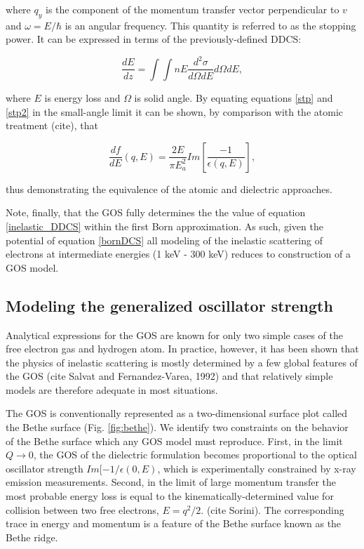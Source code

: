 \documentclass [11pt, proquest, article] {uwthesis}[2016/11/22]
\begin{document}
where $q_y$ is the component of the momentum transfer vector perpendicular to $v$ and $\omega = E/\hbar$ is an angular frequency. This quantity is referred to as the stopping power. It can be expressed in terms of the previously-defined DDCS:

\begin{equation} \label{stp2}
\frac{dE}{dz} = \int \int n E \frac{d^2\sigma}{d\Omega dE} d\Omega dE,
\end{equation}


where $E$ is energy loss and $\Omega$ is solid angle. By equating equations \ref{stp} and \ref{stp2} in the small-angle limit it can be shown, by comparison with the atomic treatment (cite), that 

$$
\frac{df}{dE}(q, E) = \frac{2E}{\pi E_a^2} Im[\frac{-1}{\epsilon(q, E)}],
$$

thus demonstrating the equivalence of the atomic and dielectric approaches.

Note, finally, that the GOS fully determines the the value of equation \ref{inelastic_DDCS} within the first Born approximation. As such, given the potential of equation \ref{bornDCS} all modeling of the inelastic scattering of electrons at intermediate energies (1 keV - 300 keV) reduces to construction of a GOS model. 




\subsection{Modeling the generalized oscillator strength}
Analytical expressions for the GOS are known for only two simple cases of the free electron gas and hydrogen atom. In practice, however, it has been shown that the physics of inelastic scattering is mostly determined by a few global features of the GOS (cite Salvat and Fernandez-Varea, 1992) and that relatively simple models are therefore adequate in most situations.


The GOS is conventionally represented as a two-dimensional surface plot called the Bethe surface (Fig. \ref{fig:bethe}). 
We identify two constraints on the behavior of the Bethe surface which any GOS model must reproduce. First, in the limit $Q\rightarrow 0$, the GOS of the dielectric formulation becomes proportional to  the optical oscillator strength $Im[-1/\epsilon(0, E)$, which is experimentally constrained by x-ray emission measurements. Second, in the limit of large momentum transfer the most probable energy loss is equal to the kinematically-determined value for collision between two free electrons, $E = q^2/2$. (cite Sorini). The corresponding trace in energy and momentum is a feature of the Bethe surface known as the Bethe ridge.
\end{document}
